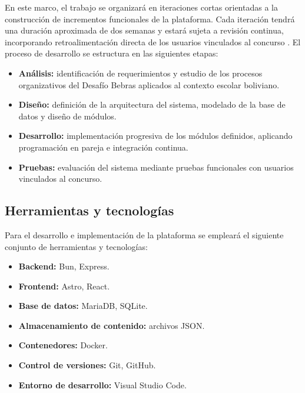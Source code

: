     En este marco, el trabajo se organizará en iteraciones cortas orientadas a la
    construcción de incrementos funcionales de la plataforma. Cada iteración tendrá
    una duración aproximada de dos semanas y estará sujeta a revisión continua,
    incorporando retroalimentación directa de los usuarios vinculados al concurso
    \cite{beckandres2004}. El proceso de desarrollo se estructura en las siguientes
    etapas:

    \begin{itemize}
        \item \textbf{Análisis:} identificación de requerimientos y estudio de los
        procesos organizativos del Desafío Bebras aplicados al contexto escolar
        boliviano.

        \item \textbf{Diseño:} definición de la arquitectura del sistema, modelado
        de la base de datos y diseño de módulos.

        \item \textbf{Desarrollo:} implementación progresiva de los módulos definidos,
        aplicando programación en pareja e integración continua.

        \item \textbf{Pruebas:} evaluación del sistema mediante pruebas funcionales
        con usuarios vinculados al concurso.
    \end{itemize}

\subsection{Herramientas y tecnologías}

    Para el desarrollo e implementación de la plataforma se empleará el siguiente
    conjunto de herramientas y tecnologías:

    \begin{itemize}
        \item \textbf{Backend:} Bun, Express.
        \item \textbf{Frontend:} Astro, React.
        \item \textbf{Base de datos:} MariaDB, SQLite.
        \item \textbf{Almacenamiento de contenido:} archivos JSON.
        \item \textbf{Contenedores:} Docker.
        \item \textbf{Control de versiones:} Git, GitHub.
        \item \textbf{Entorno de desarrollo:} Visual Studio Code.
    \end{itemize}

